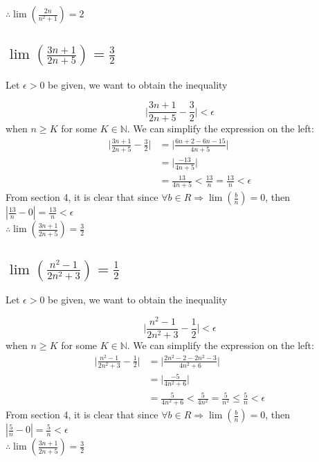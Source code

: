 \documentclass{article}
\begin{document}
$\therefore \lim(\frac{2n}{n^2 + 1}) = 2$


\subsection{$\lim(\frac{3n + 1}{2n + 5}) = \frac{3}{2}$}
Let $\epsilon > 0$ be given, we want to obtain the inequality 

\begin{equation*}
    \Big| \frac{3n + 1}{2n + 5} - \frac{3}{2} \Big| < \epsilon
\end{equation*}
when $n \ge K$ for some $K \in \mathbb{N}$. We can simplify the expression on the left:
\begin{align*}
    \Big| \frac{3n + 1}{2n + 5} - \frac{3}{2} \Big| & = \Big| \frac{6n + 2 - 6n - 15}{4n + 5} \Big| \\
                                     & = \Big| \frac{-13}{4n + 5} \Big| \\
                                    & = \frac{13}{4n + 5} < \frac{13}{n} = \frac{13}{n} < \epsilon
\end{align*}
From section 4, it is clear that since $\forall b \in R \Rightarrow \lim(\frac{b}{n}) = 0$, then $| \frac{13}{n} - 0 | = \frac{13}{n} < \epsilon$ \\
$\therefore \lim(\frac{3n + 1}{2n + 5}) = \frac{3}{2}$

\subsection{$\lim(\frac{n^2 - 1}{2n^2 + 3}) = \frac{1}{2}$}
Let $\epsilon > 0$ be given, we want to obtain the inequality 

\begin{equation*}
    \Big| \frac{n^2 - 1}{2n^2 + 3} - \frac{1}{2} \Big| < \epsilon
\end{equation*}
when $n \ge K$ for some $K \in \mathbb{N}$. We can simplify the expression on the left:
\begin{align*}
    \Big| \frac{n^2 - 1}{2n^2 + 3} - \frac{1}{2} \Big| & = \Big| \frac{2n^2 - 2 - 2n^2 - 3}{4n^2 + 6} \Big| \\
                                     & = \Big| \frac{-5}{4n^2 + 6} \Big| \\
                                    & = \frac{5}{4n^2 + 6} < \frac{5}{4n^2} = \frac{5}{n^2} \le \frac{5}{n} < \epsilon
\end{align*}
From section 4, it is clear that since $\forall b \in R \Rightarrow \lim(\frac{b}{n}) = 0$, then $| \frac{5}{n} - 0 | = \frac{5}{n} < \epsilon$ \\
$\therefore \lim(\frac{3n + 1}{2n + 5}) = \frac{3}{2}$
\end{document}
